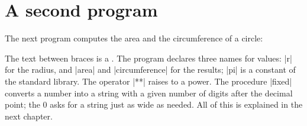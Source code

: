 \section{A second program}

The next program computes the area and the circumference of a circle:


The text between braces is a . The program declares three
names for values: \code|r| for the radius, and \code|area| and
\code|circumference| for the results; \code|pi| is a constant of the
standard library. The operator \code|**| raises to a power. The
procedure \code|fixed| converts a number into a string with a given number
of digits after the decimal point; the 0 asks for a string just as wide as
needed. All of this is explained in the next chapter.
